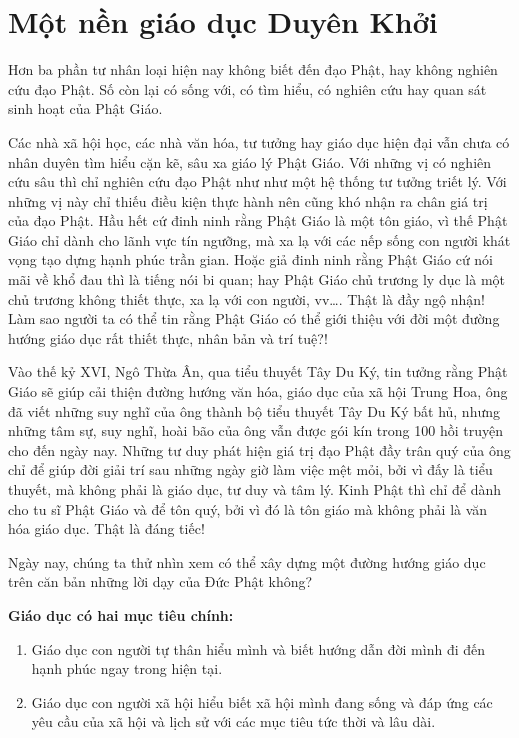 \chapter{Một nền giáo dục Duyên Khởi} %
\label{cha:mot_nen_giao_duc_duyen_khoi}

Hơn ba phần tư nhân loại hiện nay không biết đến đạo Phật, hay không nghiên cứu đạo Phật. Số còn lại có sống với, có tìm hiểu, có nghiên cứu hay quan sát sinh hoạt của Phật Giáo.

Các nhà xã hội học, các nhà văn hóa, tư tưởng hay giáo dục hiện đại vẫn chưa có nhân duyên tìm hiểu cặn kẽ, sâu xa giáo lý Phật Giáo. Với những vị có nghiên cứu sâu thì chỉ nghiên cứu đạo Phật như như một hệ thống tư tưởng triết lý. Với những vị này chỉ thiếu điều kiện thực hành nên cũng khó nhận ra chân giá trị của đạo Phật. Hầu hết cứ đinh ninh rằng Phật Giáo là một tôn giáo, vì thế Phật Giáo chỉ dành cho lãnh vực tín ngưỡng, mà xa lạ với các nếp sống con người khát vọng tạo dựng hạnh phúc trần gian. Hoặc giả đinh ninh rằng Phật Giáo cứ nói mãi về khổ đau thì là tiếng nói bi quan; hay Phật Giáo chủ trương ly dục là một chủ trương không thiết thực, xa lạ với con người, vv\ldots. Thật là đầy ngộ nhận! Làm sao người ta có thể tin rằng Phật Giáo có thể giới thiệu với đời một đường hướng giáo dục rất thiết thực, nhân bản và trí tuệ?!

Vào thế kỷ XVI, Ngô Thừa Ân, qua tiểu thuyết Tây Du Ký, tin tưởng rằng Phật Giáo sẽ giúp cải thiện đường hướng văn hóa, giáo dục của xã hội Trung Hoa, ông đã viết những suy nghĩ của ông thành bộ tiểu thuyết Tây Du Ký bất hủ, nhưng những tâm sự, suy nghĩ, hoài bão của ông vẫn được gói kín trong 100 hồi truyện cho đến ngày nay. Những tư duy phát hiện giá trị đạo Phật đầy trân quý của ông chỉ để giúp đời giải trí sau những ngày giờ làm việc mệt mỏi, bởi vì đấy là tiểu thuyết, mà không phải là giáo dục, tư duy và tâm lý. Kinh Phật thì chỉ để dành cho tu sĩ Phật Giáo và để tôn quý, bởi vì đó là tôn giáo mà không phải là văn hóa giáo dục. Thật là đáng tiếc!

Ngày nay, chúng ta thử nhìn xem có thể xây dựng một đường hướng giáo dục trên căn bản những lời dạy của Đức Phật không?

{\bf Giáo dục có hai mục tiêu chính:}

\begin{enumerate}[label=\itshape\arabic*\upshape/]

    \item Giáo dục con người tự thân hiểu mình và biết hướng dẫn đời mình đi đến hạnh phúc ngay trong hiện tại.

    \item Giáo dục con người xã hội hiểu biết xã hội mình đang sống và đáp ứng các yêu cầu của xã hội và lịch sử với các mục tiêu tức thời và lâu dài.
\end{enumerate}

